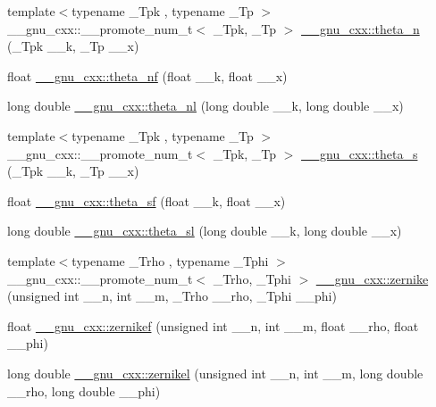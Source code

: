 \begin{DoxyCompactItemize}
\item 
{\footnotesize template$<$typename \+\_\+\+Tpk , typename \+\_\+\+Tp $>$ }\\\+\_\+\+\_\+gnu\+\_\+cxx\+::\+\_\+\+\_\+promote\+\_\+num\+\_\+t$<$ \+\_\+\+Tpk, \+\_\+\+Tp $>$ \hyperlink{group__gnu__math__spec__func_gaa2791768016201c6dab2984bf04ec4b4}{\+\_\+\+\_\+gnu\+\_\+cxx\+::theta\+\_\+n} (\+\_\+\+Tpk \+\_\+\+\_\+k, \+\_\+\+Tp \+\_\+\+\_\+x)
\item 
float \hyperlink{group__gnu__math__spec__func_ga5298a95e02bd909d55e59c1f2a0b51f8}{\+\_\+\+\_\+gnu\+\_\+cxx\+::theta\+\_\+nf} (float \+\_\+\+\_\+k, float \+\_\+\+\_\+x)
\item 
long double \hyperlink{group__gnu__math__spec__func_ga907f6c147387d55d2dfccbc58d1f1bc5}{\+\_\+\+\_\+gnu\+\_\+cxx\+::theta\+\_\+nl} (long double \+\_\+\+\_\+k, long double \+\_\+\+\_\+x)
\item 
{\footnotesize template$<$typename \+\_\+\+Tpk , typename \+\_\+\+Tp $>$ }\\\+\_\+\+\_\+gnu\+\_\+cxx\+::\+\_\+\+\_\+promote\+\_\+num\+\_\+t$<$ \+\_\+\+Tpk, \+\_\+\+Tp $>$ \hyperlink{group__gnu__math__spec__func_ga6eea3110c964e5d065d99f2e58a1ed56}{\+\_\+\+\_\+gnu\+\_\+cxx\+::theta\+\_\+s} (\+\_\+\+Tpk \+\_\+\+\_\+k, \+\_\+\+Tp \+\_\+\+\_\+x)
\item 
float \hyperlink{group__gnu__math__spec__func_ga5e69cf30c9a4cc057accc43e8c4bf7a3}{\+\_\+\+\_\+gnu\+\_\+cxx\+::theta\+\_\+sf} (float \+\_\+\+\_\+k, float \+\_\+\+\_\+x)
\item 
long double \hyperlink{group__gnu__math__spec__func_gac574077067a4e7b24a0a9ff2d537d885}{\+\_\+\+\_\+gnu\+\_\+cxx\+::theta\+\_\+sl} (long double \+\_\+\+\_\+k, long double \+\_\+\+\_\+x)
\item 
{\footnotesize template$<$typename \+\_\+\+Trho , typename \+\_\+\+Tphi $>$ }\\\+\_\+\+\_\+gnu\+\_\+cxx\+::\+\_\+\+\_\+promote\+\_\+num\+\_\+t$<$ \+\_\+\+Trho, \+\_\+\+Tphi $>$ \hyperlink{group__gnu__math__spec__func_gac43d89238752ed88927867236ab8c6a8}{\+\_\+\+\_\+gnu\+\_\+cxx\+::zernike} (unsigned int \+\_\+\+\_\+n, int \+\_\+\+\_\+m, \+\_\+\+Trho \+\_\+\+\_\+rho, \+\_\+\+Tphi \+\_\+\+\_\+phi)
\item 
float \hyperlink{group__gnu__math__spec__func_gababce1066ecef7258070b9b7fcea975f}{\+\_\+\+\_\+gnu\+\_\+cxx\+::zernikef} (unsigned int \+\_\+\+\_\+n, int \+\_\+\+\_\+m, float \+\_\+\+\_\+rho, float \+\_\+\+\_\+phi)
\item 
long double \hyperlink{group__gnu__math__spec__func_ga9236dd8545b448da9cb05dd8b7cf6811}{\+\_\+\+\_\+gnu\+\_\+cxx\+::zernikel} (unsigned int \+\_\+\+\_\+n, int \+\_\+\+\_\+m, long double \+\_\+\+\_\+rho, long double \+\_\+\+\_\+phi)
\end{DoxyCompactItemize}


